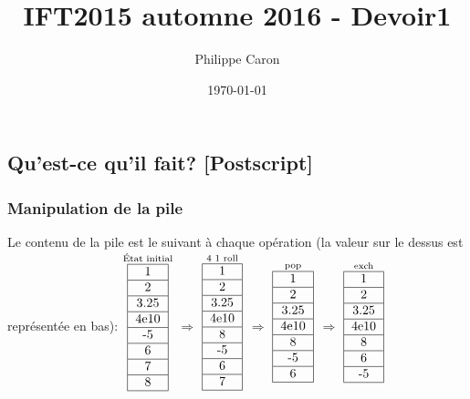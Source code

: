 \documentclass{article}
\title{IFT2015 automne 2016 - Devoir1} %
\author{Philippe Caron}
\date{\today}
\begin{document}
\maketitle

\subsection{Qu'est-ce qu'il fait? [Postscript]}
\subsubsection{Manipulation de la pile}
Le contenu de la pile est le suivant à chaque opération (la valeur sur le dessus est représentée en bas):
$\stackrel{\text{État initial}}{
  \begin{tabular}{|c|}
    \hline 1 \\
    \hline 2 \\
    \hline 3.25 \\
    \hline 4e10 \\
    \hline -5 \\
    \hline 6 \\
    \hline 7 \\
    \hline 8 \\
    \hline
\end{tabular}}$
$\Rightarrow$
$\stackrel{\text{4 1 roll}}{
  \begin{tabular}{|c|}
    \hline 1 \\
    \hline 2 \\
    \hline 3.25 \\
    \hline 4e10 \\
    \hline 8 \\
    \hline -5 \\
    \hline 6 \\
    \hline 7 \\
    \hline
\end{tabular}}$
$\Rightarrow$
$\stackrel{\text{pop}}{
  \begin{tabular}{|c|}
    \hline 1 \\
    \hline 2 \\
    \hline 3.25 \\
    \hline 4e10 \\
    \hline 8 \\
    \hline -5 \\
    \hline 6 \\
    \hline
\end{tabular}}$
$\Rightarrow$
$\stackrel{\text{exch}}{
  \begin{tabular}{|c|}
    \hline 1 \\
    \hline 2 \\
    \hline 3.25 \\
    \hline 4e10 \\
    \hline 8 \\
    \hline 6 \\
    \hline -5 \\
    \hline
\end{tabular}}$
\end{document}
